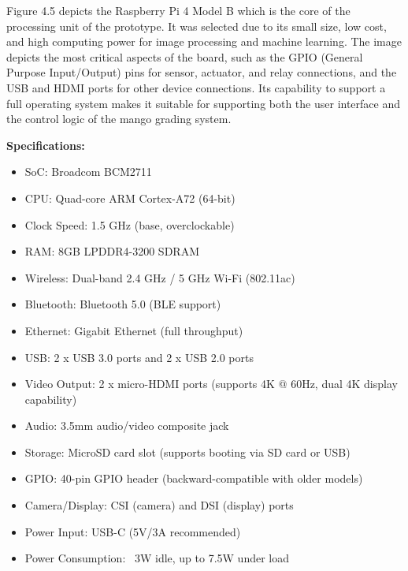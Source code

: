 Figure 4.5 depicts the Raspberry Pi 4 Model B which is the core of the
processing unit of the prototype. It was selected due to its small size, low
cost, and high computing power for image processing and machine learning. The
image depicts the most critical aspects of the board, such as the GPIO (General
Purpose Input/Output) pins for sensor, actuator, and relay connections, and the
USB and HDMI ports for other device connections. Its capability to support a
full operating system makes it suitable for supporting both the user interface
and the control logic of the mango grading system.

\textbf{Specifications:}
\begin{itemize}
    \item SoC: Broadcom BCM2711
    \item CPU: Quad-core ARM Cortex-A72 (64-bit)
    \item Clock Speed: 1.5 GHz (base, overclockable)
    \item RAM: 8GB LPDDR4-3200 SDRAM
    \item Wireless: Dual-band 2.4 GHz / 5 GHz Wi-Fi (802.11ac)
    \item Bluetooth: Bluetooth 5.0 (BLE support)
    \item Ethernet: Gigabit Ethernet (full throughput)
    \item USB: 2 x USB 3.0 ports and 2 x USB 2.0 ports
    \item Video Output: 2 x micro-HDMI ports (supports 4K @ 60Hz, dual 4K display capability)
    \item Audio: 3.5mm audio/video composite jack
    \item Storage: MicroSD card slot (supports booting via SD card or USB)
    \item GPIO: 40-pin GPIO header (backward-compatible with older models)
    \item Camera/Display: CSI (camera) and DSI (display) ports
    \item Power Input: USB-C (5V/3A recommended)
    \item Power Consumption: ~3W idle, up to 7.5W under load
\end{itemize}

